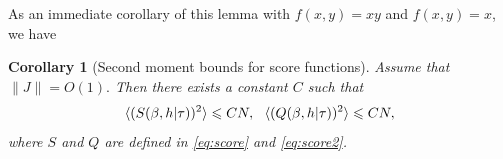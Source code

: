 \documentclass[letterpaper,11pt,reqno]{amsart}
\newtheorem{cor}[thm]{Corollary}
\renewcommand{\le}{\leqslant}
\newcommand{\ra}{\rangle}
\newcommand{\la}{\langle}
\newcommand{\mvgs}{{\sigma}}
\newcommand{\mvgt}{{\tau}}
\begin{document}
As an immediate corollary of this lemma with $f(x,y)=xy$ and $f(x,y)=x$, we have 

\begin{cor}[Second moment bounds for score functions]\label{cor:conc_score}
Assume that $\|J \| = O(1).$ Then there exists a constant $C$ such that 
\[
\la (S(\gb,h|\mvgt))^2 \ra \le CN, \ \  \la (Q(\gb,h|\mvgt))^2 \ra \le C N,
\]
where $S$ and $Q$ are defined in \eqref{eq:score} and \eqref{eq:score2}.
\end{cor}

\end{document}
